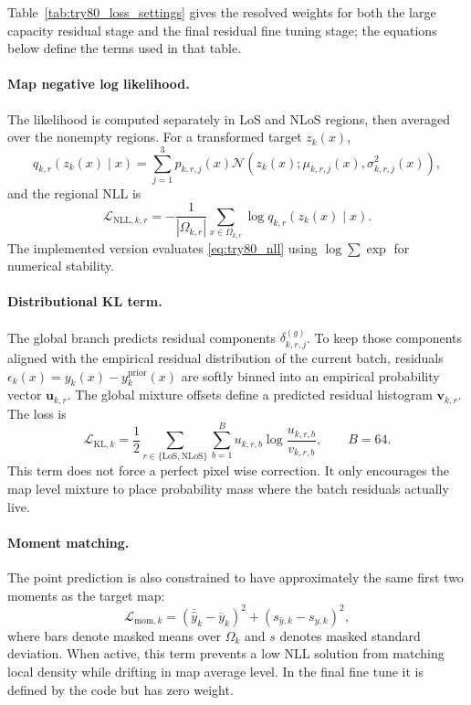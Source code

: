 Table~\ref{tab:try80_loss_settings} gives the resolved weights for both the
large capacity residual stage and the final residual fine tuning stage; the
equations below define the terms used in that table.

\paragraph{Map negative log likelihood.}
The likelihood is computed separately in LoS and NLoS regions, then averaged
over the nonempty regions. For a transformed target \(z_k(x)\),
\begin{equation}
q_{k,r}\!\left(z_k(x)\mid x\right)
=
\sum_{j=1}^{3}
p_{k,r,j}(x)
\mathcal{N}
\left(
z_k(x);
\mu_{k,r,j}(x),
\sigma^2_{k,r,j}(x)
\right),
\label{eq:try80_mixture_density}
\end{equation}
and the regional NLL is
\begin{equation}
\mathcal{L}_{\mathrm{NLL},k,r}
=
-
\frac{1}{|\Omega_{k,r}|}
\sum_{x\in\Omega_{k,r}}
\log q_{k,r}\!\left(z_k(x)\mid x\right).
\label{eq:try80_nll}
\end{equation}
The implemented version evaluates \eqref{eq:try80_nll} using
\(\log\sum\exp\) for numerical stability.

\paragraph{Distributional KL term.}
The global branch predicts residual components
\(\delta^{(g)}_{k,r,j}\). To keep those components aligned with the empirical
residual distribution of the current batch, residuals
\(\epsilon_k(x)=y_k(x)-y^{\mathrm{prior}}_k(x)\) are softly binned into an
empirical probability vector \(\textbf{u}_{k,r}\). The global mixture offsets
define a predicted residual histogram \(\textbf{v}_{k,r}\). The loss is
\begin{equation}
\mathcal{L}_{\mathrm{KL},k}
=
\frac{1}{2}
\sum_{r\in\{\mathrm{LoS},\mathrm{NLoS}\}}
\sum_{b=1}^{B}
u_{k,r,b}
\log
\frac{u_{k,r,b}}{v_{k,r,b}},
\qquad B=64.
\label{eq:try80_kl}
\end{equation}
This term does not force a perfect pixel wise correction. It only encourages
the map level mixture to place probability mass where the batch residuals
actually live.

\paragraph{Moment matching.}
The point prediction is also constrained to have approximately the same first
two moments as the target map:
\begin{equation}
\mathcal{L}_{\mathrm{mom},k}
=
\left(\bar{\hat y}_k-\bar y_k\right)^2
+
\left(s_{\hat y,k}-s_{y,k}\right)^2,
\label{eq:try80_moment}
\end{equation}
where bars denote masked means over \(\Omega_k\) and \(s\) denotes masked
standard deviation. When active, this term prevents a low NLL solution from
matching local density while drifting in map average level. In the final
fine tune it is defined by the code but has zero weight.

